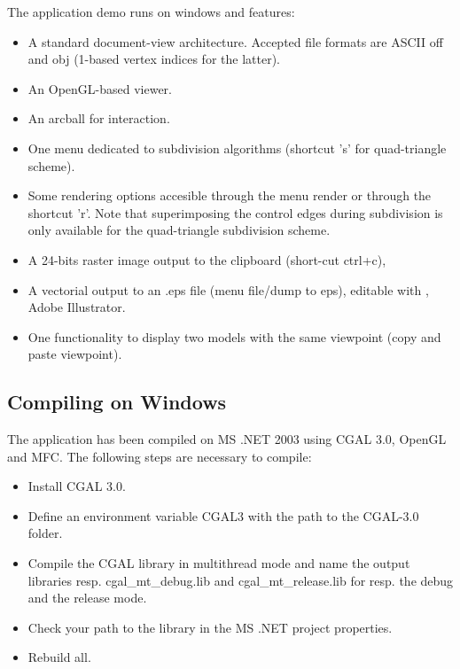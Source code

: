 
The application demo runs on windows and features:
\begin{itemize}

\item 
A standard document-view architecture. Accepted file formats are ASCII
off and obj (1-based vertex indices for the latter).

\item 
An OpenGL-based viewer.

\item 
An arcball for interaction.

\item 
One menu dedicated to subdivision algorithms (shortcut 's' for
quad-triangle scheme).

\item 
Some rendering options accesible through the menu render or through
the shortcut 'r'. Note that superimposing the control edges during
subdivision is only available for the quad-triangle subdivision
scheme.

\item 
A 24-bits raster image output to the clipboard (short-cut ctrl+c),

\item 
A vectorial output to an .eps file (menu file/dump to eps), editable
with , Adobe Illustrator.

\item 
One functionality to display two models with the same viewpoint (copy
and paste viewpoint).

\end{itemize}

\subsection{Compiling on Windows}

The application has been compiled on MS .NET 2003 using CGAL 3.0,
OpenGL and MFC. The following steps are necessary to compile:
\begin{itemize}
\item Install CGAL 3.0.
\item Define an environment variable CGAL3 with the path to the CGAL-3.0 folder.
\item Compile the CGAL library in multithread mode and name the output 
      libraries resp. cgal\_mt\_debug.lib and cgal\_mt\_release.lib 
      for resp. the debug and the release mode.
\item Check your path to the library in the MS .NET project
      properties.
\item Rebuild all.
\end{itemize}
